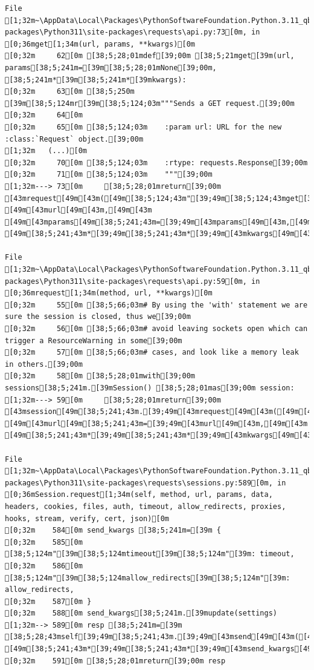 \documentclass[
  letterpaper,
]{book}
\begin{document}
\begin{verbatim}
File [1;32m~\AppData\Local\Packages\PythonSoftwareFoundation.Python.3.11_qbz5n2kfra8p0\LocalCache\local-packages\Python311\site-packages\requests\api.py:73[0m, in [0;36mget[1;34m(url, params, **kwargs)[0m
[0;32m     62[0m [38;5;28;01mdef[39;00m [38;5;21mget[39m(url, params[38;5;241m=[39m[38;5;28;01mNone[39;00m, [38;5;241m*[39m[38;5;241m*[39mkwargs):
[0;32m     63[0m [38;5;250m    [39m[38;5;124mr[39m[38;5;124;03m"""Sends a GET request.[39;00m
[0;32m     64[0m 
[0;32m     65[0m [38;5;124;03m    :param url: URL for the new :class:`Request` object.[39;00m
[1;32m   (...)[0m
[0;32m     70[0m [38;5;124;03m    :rtype: requests.Response[39;00m
[0;32m     71[0m [38;5;124;03m    """[39;00m
[1;32m---> 73[0m     [38;5;28;01mreturn[39;00m [43mrequest[49m[43m([49m[38;5;124;43m"[39;49m[38;5;124;43mget[39;49m[38;5;124;43m"[39;49m[43m,[49m[43m [49m[43murl[49m[43m,[49m[43m [49m[43mparams[49m[38;5;241;43m=[39;49m[43mparams[49m[43m,[49m[43m [49m[38;5;241;43m*[39;49m[38;5;241;43m*[39;49m[43mkwargs[49m[43m)[49m

File [1;32m~\AppData\Local\Packages\PythonSoftwareFoundation.Python.3.11_qbz5n2kfra8p0\LocalCache\local-packages\Python311\site-packages\requests\api.py:59[0m, in [0;36mrequest[1;34m(method, url, **kwargs)[0m
[0;32m     55[0m [38;5;66;03m# By using the 'with' statement we are sure the session is closed, thus we[39;00m
[0;32m     56[0m [38;5;66;03m# avoid leaving sockets open which can trigger a ResourceWarning in some[39;00m
[0;32m     57[0m [38;5;66;03m# cases, and look like a memory leak in others.[39;00m
[0;32m     58[0m [38;5;28;01mwith[39;00m sessions[38;5;241m.[39mSession() [38;5;28;01mas[39;00m session:
[1;32m---> 59[0m     [38;5;28;01mreturn[39;00m [43msession[49m[38;5;241;43m.[39;49m[43mrequest[49m[43m([49m[43mmethod[49m[38;5;241;43m=[39;49m[43mmethod[49m[43m,[49m[43m [49m[43murl[49m[38;5;241;43m=[39;49m[43murl[49m[43m,[49m[43m [49m[38;5;241;43m*[39;49m[38;5;241;43m*[39;49m[43mkwargs[49m[43m)[49m

File [1;32m~\AppData\Local\Packages\PythonSoftwareFoundation.Python.3.11_qbz5n2kfra8p0\LocalCache\local-packages\Python311\site-packages\requests\sessions.py:589[0m, in [0;36mSession.request[1;34m(self, method, url, params, data, headers, cookies, files, auth, timeout, allow_redirects, proxies, hooks, stream, verify, cert, json)[0m
[0;32m    584[0m send_kwargs [38;5;241m=[39m {
[0;32m    585[0m     [38;5;124m"[39m[38;5;124mtimeout[39m[38;5;124m"[39m: timeout,
[0;32m    586[0m     [38;5;124m"[39m[38;5;124mallow_redirects[39m[38;5;124m"[39m: allow_redirects,
[0;32m    587[0m }
[0;32m    588[0m send_kwargs[38;5;241m.[39mupdate(settings)
[1;32m--> 589[0m resp [38;5;241m=[39m [38;5;28;43mself[39;49m[38;5;241;43m.[39;49m[43msend[49m[43m([49m[43mprep[49m[43m,[49m[43m [49m[38;5;241;43m*[39;49m[38;5;241;43m*[39;49m[43msend_kwargs[49m[43m)[49m
[0;32m    591[0m [38;5;28;01mreturn[39;00m resp


\end{verbatim}
\end{document}
